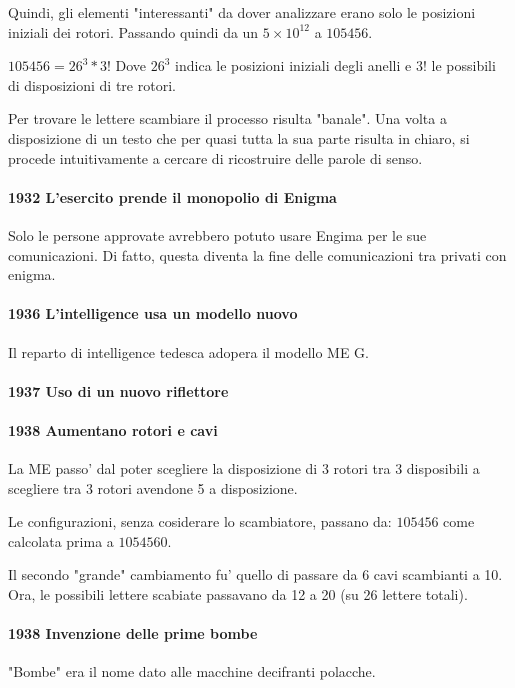 Quindi, gli elementi "interessanti" da dover analizzare erano solo le posizioni
iniziali dei rotori.
Passando quindi da un $5\times10^{12}$ a $105456$.

$105456 = 26^{3} * 3!$
Dove $26^3$ indica le posizioni iniziali degli anelli e $3!$ le possibili di disposizioni
di tre rotori.

Per trovare le lettere scambiare il processo risulta "banale".
Una volta a disposizione di un testo che per quasi tutta la sua parte risulta in chiaro,
si procede intuitivamente a cercare di ricostruire delle parole di senso.

\paragraph{1932 L'esercito prende il monopolio di Enigma}
Solo le persone approvate avrebbero potuto usare Engima per le sue comunicazioni.
Di fatto, questa diventa la fine delle comunicazioni tra privati con enigma.

\paragraph{1936 L'intelligence usa un modello nuovo}
Il reparto di intelligence tedesca adopera il modello ME G.

\paragraph{1937 Uso di un nuovo riflettore}

\paragraph{1938 Aumentano rotori e cavi}
La ME passo' dal poter scegliere la disposizione di 3 rotori tra 3 disposibili a
scegliere tra 3 rotori avendone 5 a disposizione.

Le configurazioni, senza cosiderare lo scambiatore, passano da:
$105456$ come calcolata prima a $1054560$.

Il secondo "grande" cambiamento fu' quello di passare da 6 cavi scambianti a 10.
Ora, le possibili lettere scabiate passavano da 12 a 20 (su 26 lettere totali).

\paragraph{1938 Invenzione delle prime bombe}
"Bombe" era il nome dato alle macchine decifranti polacche.

